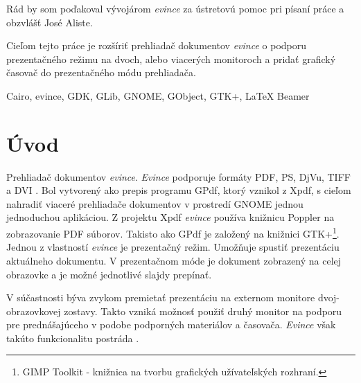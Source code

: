 \documentclass[12pt,oneside,final]{fithesis2}
\begin{document}
\FrontMatter
\ThesisTitlePage

\begin{ThesisDeclaration}
\DeclarationText
\AdvisorName
\end{ThesisDeclaration}

\begin{ThesisThanks}
Rád by som poďakoval vývojárom \emph{evince} za ústretovú pomoc pri písaní práce a obzvlášť José Aliste.
\end{ThesisThanks}  

\begin{ThesisAbstract}
Cieľom tejto práce je rozšíriť prehliadač dokumentov \emph{evince} o podporu prezentačného režimu na dvoch, alebo viacerých monitoroch a pridať grafický časovač do prezentačného módu prehliadača.
\end{ThesisAbstract}

\begin{ThesisKeyWords}
Cairo, evince, GDK, GLib, GNOME, GObject, GTK+, LaTeX Beamer
\end{ThesisKeyWords}
 
\MainMatter
\setcounter{tocdepth}{3}
\tableofcontents 
 
\chapter{Úvod}
Prehliadač dokumentov \emph{evince}. \emph{Evince} podporuje formáty PDF, PS, DjVu, TIFF a DVI \cite{evince}. Bol vytvorený ako prepis programu GPdf, ktorý vznikol z Xpdf, s cieľom nahradiť viaceré prehliadače dokumentov v prostredí GNOME jednou jednoduchou aplikáciou. Z projektu Xpdf \emph{evince} používa knižnicu Poppler \cite{poppler} na zobrazovanie PDF súborov. Takisto ako GPdf je založený na knižnici GTK+\footnote{GIMP Toolkit - knižnica na tvorbu grafických užívateľských rozhraní.}. Jednou z vlastností \emph{evince} je prezentačný režim. Umožňuje spustiť prezentáciu aktuálneho dokumentu. V prezentačnom móde je dokument zobrazený na celej obrazovke a je možné jednotlivé slajdy prepínať.
 
 V súčastnosti býva zvykom premietať prezentáciu na externom monitore dvoj-obrazovkovej zostavy. Takto vzniká možnosť použiť druhý monitor na podporu pre prednášajúceho v podobe podporných materiálov a časovača. \emph{Evince} však takúto funkcionalitu postráda \cite{evbug}.
 
\end{document}

